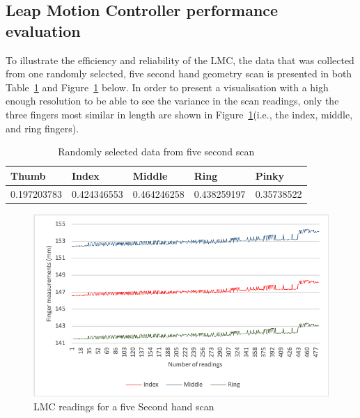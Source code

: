 \subsection{Leap Motion Controller performance evaluation}

To illustrate the efficiency and reliability of the LMC, the data that was collected from one randomly selected, five second hand geometry scan is presented in both Table~\ref{table: Randomly selected data from five second scan} and Figure~\ref{fig:Five Second hand scan graph} below. 
In order to present a visualisation with a high enough resolution to be able to see the variance in the scan readings, only the three fingers most similar in length are shown in Figure~\ref{fig:Five Second hand scan graph}(i.e., the index, middle, and ring fingers). 

    
    \begin{table}[h!]
    \caption{Randomly selected data from five second scan}
    \centering
     \begin{tabular}{|p{} | p{}| p{}| p{}| p{}|} 
     \hline
    	\textbf{Thumb} & \textbf{Index} & \textbf{Middle} & \textbf{Ring} & \textbf{Pinky} \\ [1ex] 
     \hline\hline 
     0.197203783 & 0.424346553 &  0.464246258 & 0.438259197 & 0.35738522 \\[1ex]
     \hline 
     \end{tabular}
     \label{table: Randomly selected data from five second scan}
    \end{table}

    
    \begin{figure}[htbp!] 
    \centering    
    \includegraphics[width=1.0\textwidth]{Chapter4/Figs/Consistency.png}
    \caption[Five Second hand scan]{LMC readings for a five Second hand scan }
    \label{fig:Five Second hand scan graph}
    \end{figure}
    
